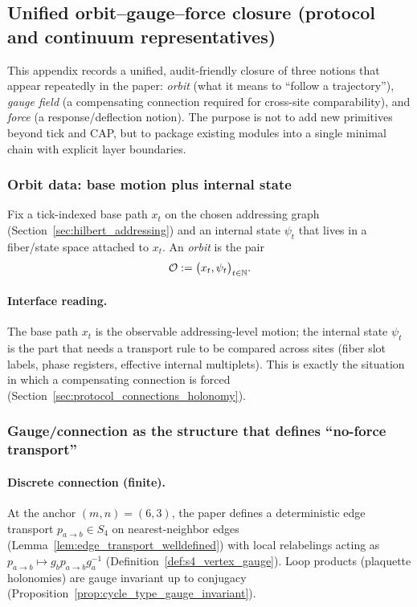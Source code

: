 \subsection{Unified orbit--gauge--force closure (protocol and continuum representatives)}
\label{app:unified_orbit_gauge_force}

This appendix records a unified, audit-friendly closure of three notions that appear repeatedly in the paper:
\emph{orbit} (what it means to ``follow a trajectory''), \emph{gauge field} (a compensating connection required for cross-site comparability), and \emph{force} (a response/deflection notion).
The purpose is not to add new primitives beyond tick and CAP, but to package existing modules into a single minimal chain with explicit layer boundaries.

\subsubsection{Orbit data: base motion plus internal state}
\begin{definition}
\label{def:protocol_orbit_base_internal}
Fix a tick-indexed base path $x_t$ on the chosen addressing graph (Section~\ref{sec:hilbert_addressing}) and an internal state $\psi_t$ that lives in a fiber/state space attached to $x_t$.
An \emph{orbit} is the pair
\[
\mathcal{O}:=\bigl(x_t,\psi_t\bigr)_{t\in\mathbb{N}}.
\]
\end{definition}

\paragraph{Interface reading.}
\InterfaceTag The base path $x_t$ is the observable addressing-level motion; the internal state $\psi_t$ is the part that needs a transport rule to be compared across sites (fiber slot labels, phase registers, effective internal multiplets).
This is exactly the situation in which a compensating connection is forced (Section~\ref{sec:protocol_connections_holonomy}).

\subsubsection{Gauge/connection as the structure that defines ``no-force transport''}
\paragraph{Discrete connection (finite).}
At the anchor $(m,n)=(6,3)$, the paper defines a deterministic edge transport $p_{a\to b}\in S_4$ on nearest-neighbor edges (Lemma~\ref{lem:edge_transport_welldefined}) with local relabelings acting as
$p_{a\to b}\mapsto g_b p_{a\to b} g_a^{-1}$ (Definition~\ref{def:s4_vertex_gauge}).
Loop products (plaquette holonomies) are gauge invariant up to conjugacy (Proposition~\ref{prop:cycle_type_gauge_invariant}).


